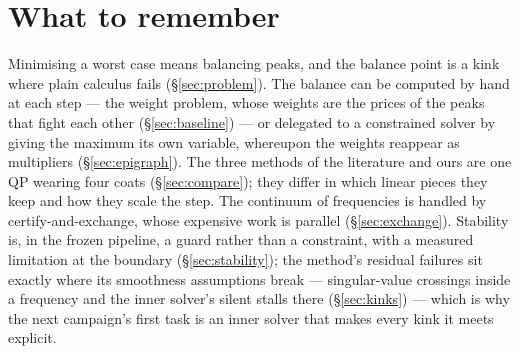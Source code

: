 \documentclass[11pt,a4paper]{article}
\begin{document}
\section{What to remember}
Minimising a worst case means balancing peaks, and the balance point is a kink where
plain calculus fails (\S\ref{sec:problem}).  The balance can be computed by hand at each
step --- the weight problem, whose weights are the prices of the peaks that fight each
other (\S\ref{sec:baseline}) --- or delegated to a constrained solver by giving the
maximum its own variable, whereupon the weights reappear as multipliers
(\S\ref{sec:epigraph}).  The three methods of the literature and ours are one QP wearing
four coats (\S\ref{sec:compare}); they differ in which linear pieces they keep and how
they scale the step.  The continuum of frequencies is handled by certify-and-exchange,
whose expensive work is parallel (\S\ref{sec:exchange}).  Stability is, in the frozen
pipeline, a guard rather than a constraint, with a measured limitation at the boundary
(\S\ref{sec:stability}); the method's residual failures sit exactly where its smoothness
assumptions break --- singular-value crossings inside a frequency and the inner solver's
silent stalls there (\S\ref{sec:kinks}) --- which is why the next campaign's first task
is an inner solver that makes every kink it meets explicit.
\end{document}
